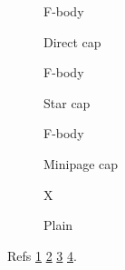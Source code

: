 \documentclass{article}
\begin{document}
\listoffigures
\begin{figure}
F-body\caption{Direct cap}\label{F1}
\end{figure}
\begin{figure}
F-body\caption{Star cap}\label{F4}
\end{figure}
\begin{figure}
\begin{minipage}{.5\linewidth}F-body\caption{Minipage cap}\label{F2}\end{minipage}
\end{figure}
\begin{figure}
X\caption{Plain}\label{F3}
\end{figure}
Refs \ref{F1} \ref{F4} \ref{F2} \ref{F3}.
\end{document}
